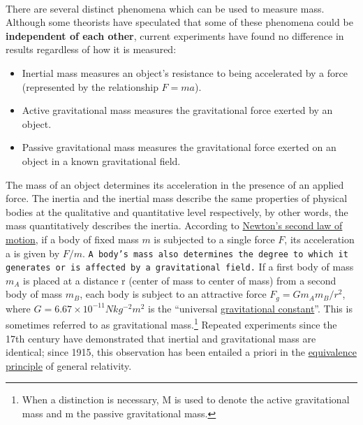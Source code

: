\documentclass{book}
\begin{document}
    \begin{doublespace}
    \paragraph{}
    There are several distinct phenomena which can be used to measure mass. Although some theorists have speculated that some of these phenomena could be \textbf{independent of each other}\cite{mit-inertial-mass}, current experiments have found no difference in results regardless of how it is measured:
    
    \begin{itemize}
	    \item Inertial mass measures an object's resistance to being accelerated by a force (represented by the relationship $F = ma$).
        \item Active gravitational mass measures the gravitational force exerted by an object.
        \item Passive gravitational mass measures the gravitational force exerted on an object in a known gravitational field.
    \end{itemize}    
    
    The mass of an object determines its acceleration in the presence of an applied force. The inertia and the inertial mass describe the same properties of physical bodies at the qualitative and quantitative level respectively, by other words, the mass quantitatively describes the inertia. According to \href{https://en.wikipedia.org/wiki/Newton\%27s_laws_of_motion#Newton's_second_law}{Newton's second law of motion}, if a body of fixed mass $m$ is subjected to a single force $F$, its acceleration a is given by $F/m$. \texttt{A body's mass also determines the degree to which it generates or is affected by a gravitational field.} If a first body of mass $m_A$ is placed at a distance r (center of mass to center of mass) from a second body of mass $m_B$, each body is subject to an attractive force $F_g = Gm_Am_B/r^2$, where $G = 6.67 \times 10^{-11} N kg^{-2} m^2$ is the ``universal \href{https://en.wikipedia.org/wiki/Gravitational_constant}{gravitational constant}''. This is sometimes referred to as gravitational mass.\footnote{When a distinction is necessary, M is used to denote the active gravitational mass and m the passive gravitational mass.} Repeated experiments since the 17th century have demonstrated that inertial and gravitational mass are identical; since 1915, this observation has been entailed a priori in the \href{https://en.wikipedia.org/wiki/Equivalence_principle}{equivalence principle} of general relativity.
    \end{doublespace}
    	
\end{document}
